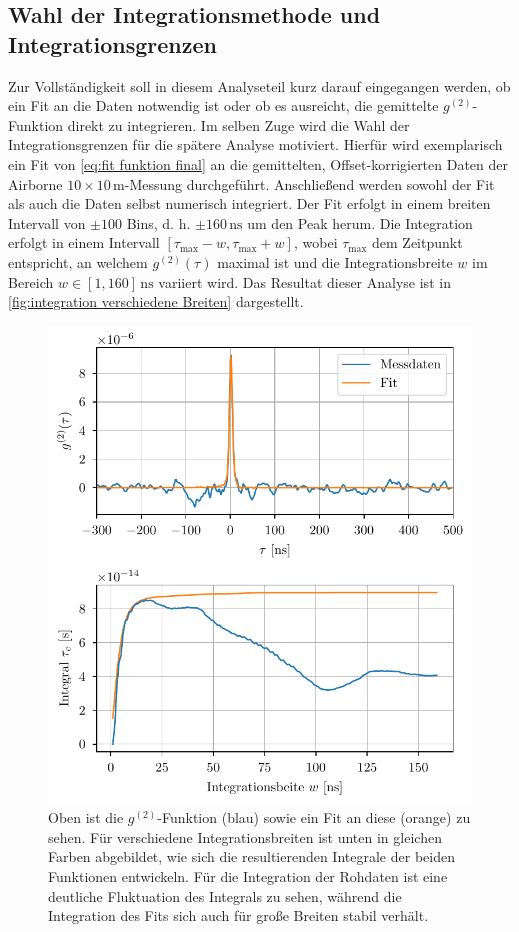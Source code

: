 \subsection{Wahl der Integrationsmethode und Integrationsgrenzen}
\label{ssec:Wahl der Integrationsmethode}
Zur Vollständigkeit soll in diesem Analyseteil kurz darauf eingegangen werden, ob ein Fit an die Daten notwendig ist oder ob es ausreicht, die gemittelte $g^{(2)}$-Funktion direkt zu integrieren. 
Im selben Zuge wird die Wahl der Integrationsgrenzen für die spätere Analyse motiviert. 
Hierfür wird exemplarisch ein Fit von \autoref{eq:fit funktion final} an die gemittelten, Offset-korrigierten Daten der Airborne $10\times 10\,\mathrm{m}$-Messung durchgeführt. 
Anschließend werden sowohl der Fit als auch die Daten selbst numerisch integriert. 
Der Fit erfolgt in einem breiten Intervall von $\pm 100$ Bins, d. h. $\pm 160\,\mathrm{ns}$ um den Peak herum. 
Die Integration erfolgt in einem Intervall $[\tau_{\mathrm{max}}-w, \tau_{\mathrm{max}}+w]$, wobei $\tau_{\mathrm{max}}$ dem Zeitpunkt entspricht, an welchem $g^{(2)}(\tau)$ maximal ist und die Integrationsbreite $w$ im Bereich $w\in [1,160]\,\mathrm{ns}$ variiert wird. 
Das Resultat dieser Analyse ist in \autoref{fig:integration verschiedene Breiten} dargestellt. 
\begin{figure}[hp]
    \centering
    \includegraphics{images/Analysis/integration_different_width.pdf}
    \caption{Oben ist die $g^{(2)}$-Funktion (blau) sowie ein Fit an diese (orange) zu sehen. Für verschiedene Integrationsbreiten ist unten in gleichen Farben abgebildet, wie sich die resultierenden Integrale der beiden Funktionen entwickeln. Für die Integration der Rohdaten ist eine deutliche Fluktuation des Integrals zu sehen, während die Integration des Fits sich auch für große Breiten stabil verhält.}
    \label{fig:integration verschiedene Breiten}
\end{figure}
